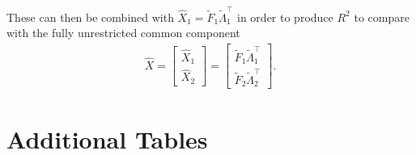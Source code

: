 \documentclass[12pt]{article}
\newcommand*{\tran}{\intercal}
\theoremstyle{plain}
\numberwithin{equation}{section}
\begin{document}
These can then be combined with $\widehat{X}_1 = \tilde{F}_1 \tilde{\Lambda}_1^\tran$ in order to produce $R^2$ to compare with the fully unrestricted common component
\begin{align*}
\widehat{X} = 
\begin{bmatrix}
\widehat{X}_1 \\
\widehat{X}_2
\end{bmatrix} = 
\begin{bmatrix}
\tilde{F}_1 \tilde{\Lambda}_1^\tran \\
\tilde{F}_2 \tilde{\Lambda}_2^\tran
\end{bmatrix}.
\end{align*}

\section{Additional Tables}
\end{document}
